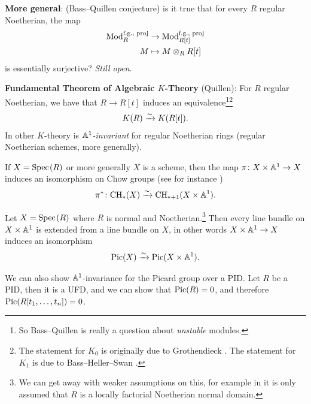 \documentclass[11pt]{amsart}
\begin{document}
\textbf{More general}: (Bass--Quillen conjecture) is it true that for every $R$ regular Noetherian, the map
\begin{align*}
    \mathrm{Mod}_R^{\text{f.g., proj}} &\to \mathrm{Mod}_{R[t]}^{\text{f.g., proj}} \\
    M &\mapsto M \otimes_R R[t]
\end{align*}
is essentially surjective? \textit{Still open}.

\textbf{Fundamental Theorem of Algebraic $K$-Theory} (Quillen): For $R$ regular Noetherian, we have that $R \to R[t]$ induces an equivalence\footnote{%
So Bass--Quillen is really a question about \textit{unstable} modules.}\footnote{%
The statement for $K_0$ is originally due to Grothendieck \cite[5.6.1.3]{Aravind}. The statement for $K_1$ is due to Bass--Heller--Swan \cite[5.8.2.1]{Aravind}.
}
\begin{align*}
    K(R) \xrightarrow{\sim} K(R[t]).
\end{align*}
%
In other $K$-theory is \textit{$\mathbb{A}^1$-invariant} for regular Noetherian rings (regular Noetherian schemes, more generally).

\begin{example} If $X = \text{Spec}\hspace{0.1em}(R)$ or more generally $X$ is a scheme, then the map $\pi \colon X \times \mathbb{A}^1 \to X$ induces an isomorphism on Chow groups (see for instance \cite[3.3]{Fulton})
\begin{align*}
    \pi^\ast \colon \mathrm{CH}_\ast(X) \xrightarrow{\sim} \mathrm{CH}_{\ast+1}(X \times \mathbb{A}^1).
\end{align*}
\end{example}

\begin{example} Let $X = \text{Spec}\hspace{0.1em}(R)$ where $R$ is normal and Noetherian.\footnote{%
We can get away with weaker assumptions on this, for example in \cite[3.7.13]{Aravind} it is only assumed that $R$ is a locally factorial Noetherian normal domain.
}
Then every line bundle on $X \times \mathbb{A}^1$ is extended from a line bundle on $X$, in other words $X \times \mathbb{A}^1 \to X$ induces an isomorphism
\begin{align*}
    \mathrm{Pic}(X) \xrightarrow{\sim} \mathrm{Pic}(X \times\mathbb{A}^1).
\end{align*}
\end{example}

\begin{example} We can also show $\mathbb{A}^1$-invariance for the Picard group over a PID. Let $R$ be a PID, then it is a UFD, and we can show that $\mathrm{Pic}(R) = 0$, and therefore $\mathrm{Pic}(R[t_1, \ldots, t_n])=0$.
\end{example}
\end{document}

